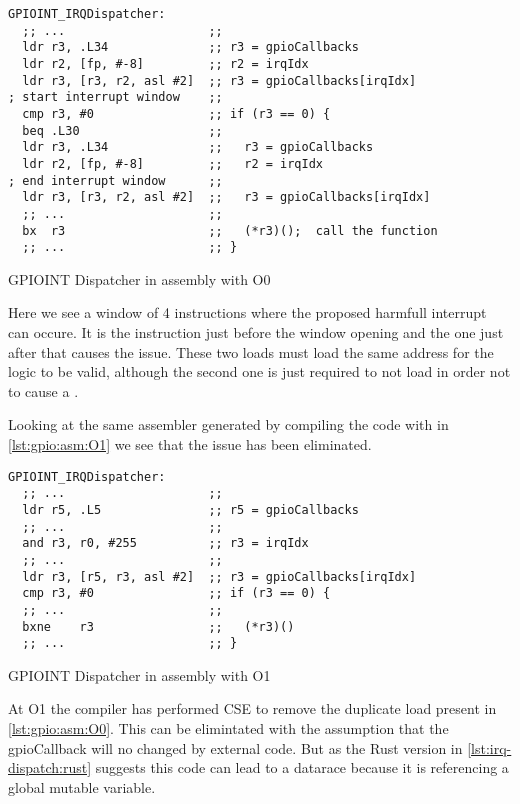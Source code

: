 \begin{listing}[H]
  \begin{verbatim}
GPIOINT_IRQDispatcher:
  ;; ...                    ;;
  ldr r3, .L34              ;; r3 = gpioCallbacks
  ldr r2, [fp, #-8]         ;; r2 = irqIdx
  ldr r3, [r3, r2, asl #2]  ;; r3 = gpioCallbacks[irqIdx]
; start interrupt window    ;;
  cmp r3, #0                ;; if (r3 == 0) {
  beq .L30                  ;;
  ldr r3, .L34              ;;   r3 = gpioCallbacks
  ldr r2, [fp, #-8]         ;;   r2 = irqIdx
; end interrupt window      ;;
  ldr r3, [r3, r2, asl #2]  ;;   r3 = gpioCallbacks[irqIdx]
  ;; ...                    ;;
  bx  r3                    ;;   (*r3)();  call the function
  ;; ...                    ;; }
  \end{verbatim}
  \caption{GPIOINT Dispatcher in assembly with O0}
  \label{lst:gpio:asm:O0}
\end{listing}

Here we see a window of 4 instructions where the proposed harmfull interrupt can occure.
It is the  instruction just before the window opening and the one just after that causes the issue.
These two loads must load the same address for the logic to be valid, although the second one is just required to not load  in order not to cause a .

Looking at the same assembler generated by compiling the code with  in \autoref{lst:gpio:asm:O1} we see that the issue has been eliminated.

\begin{listing}[H]
  \begin{verbatim}
GPIOINT_IRQDispatcher:
  ;; ...                    ;;
  ldr r5, .L5               ;; r5 = gpioCallbacks
  ;; ...                    ;;
  and r3, r0, #255          ;; r3 = irqIdx
  ;; ...                    ;;
  ldr r3, [r5, r3, asl #2]  ;; r3 = gpioCallbacks[irqIdx]
  cmp r3, #0                ;; if (r3 == 0) {
  ;; ...                    ;;
  bxne    r3                ;;   (*r3)()
  ;; ...                    ;; }
  \end{verbatim}
  \caption{GPIOINT Dispatcher in assembly with O1}
  \label{lst:gpio:asm:O1}
\end{listing}

At O1 the compiler has performed \gls{CSE} to remove the duplicate load present in \autoref{lst:gpio:asm:O0}.
This can be elimintated with the assumption that the gpioCallback will no changed by external code.
But as the Rust version in \autoref{lst:irq-dispatch:rust} suggests this code can lead to a datarace because it is referencing a global mutable variable.

